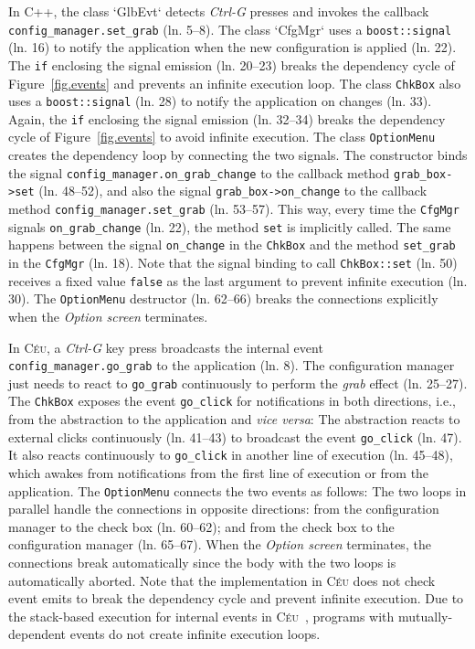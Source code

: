 \documentclass{vgtc}                          %
\newcommand{\CEU}{\textsc{C\'{e}u}\xspace}
\newcommand{\code}[1] {{\small{\texttt{#1}}}}
\begin{document}
In C++, the class `GlbEvt` detects \emph{Ctrl-G} presses and invokes the
callback \code{config\_manager.set\_grab} (ln. 5--8).
%
The class `CfgMgr` uses a \code{boost::signal} (ln. 16) to notify the
application when the new configuration is applied (ln. 22).
%
The \code{if} enclosing the signal emission (ln. 20--23) breaks the dependency 
cycle of Figure~\ref{fig.events} and prevents an infinite execution loop.
%
The class \code{ChkBox} also uses a \code{boost::signal} (ln. 28) to notify
the application on changes (ln. 33).
%
Again, the \code{if} enclosing the signal emission (ln. 32--34) breaks the 
dependency cycle of Figure~\ref{fig.events} to avoid infinite execution.
%
The class \code{OptionMenu} creates the dependency loop by connecting the two
signals.
%
The constructor binds
the signal \code{config\_manager.on\_grab\_change} to the callback
    method \code{grab\_box->set} (ln. 48--52),
and also
the signal \code{grab\_box->on\_change} to the callback method
    \code{config\_manager.set\_grab} (ln. 53--57).
This way, every time the \code{CfgMgr} signals
\code{on\_grab\_change} (ln. 22), the method \code{set} is implicitly called.
The same happens between the signal \code{on\_change} in the \code{ChkBox}
and the method \code{set\_grab} in the \code{CfgMgr} (ln. 18).
%
Note that the signal binding to call \code{ChkBox::set} (ln. 50) receives a
fixed value \code{false} as the last argument to prevent infinite execution
(ln. 30).
%
The \code{OptionMenu} destructor (ln. 62--66) breaks the connections explicitly
when the \emph{Option screen} terminates.

In \CEU, a \emph{Ctrl-G} key press broadcasts the internal event
\code{config\_manager.go\_grab} to the application (ln. 8).
%
The configuration manager just needs to react to \code{go\_grab}
continuously to perform the \emph{grab} effect (ln. 25--27).
%
The \code{ChkBox} exposes the event \code{go\_click} for notifications in
both directions, i.e., from the abstraction to the application and
\emph{vice versa}:
%
The abstraction reacts to external clicks continuously (ln. 41--43) to
broadcast the event \code{go\_click} (ln. 47).
It also reacts continuously to \code{go\_click} in another line of execution
(ln. 45--48), which awakes from notifications from the first line of execution
or from the application.
%
The \code{OptionMenu} connects the two events as follows:
%
The two loops in parallel handle the connections in opposite directions:
from the configuration manager to the check box (ln. 60--62);
and
from the check box to the configuration manager (ln. 65--67).
%
When the \emph{Option screen} terminates, the connections break automatically
since the body with the two loops is automatically aborted.
%
Note that the implementation in \CEU does not check event emits to break the
dependency cycle and prevent infinite execution.
Due to the stack-based execution for internal events in
\CEU~\cite{ceu.sensys13)}, programs with mutually-dependent events do not
create infinite execution loops.
\end{document}
